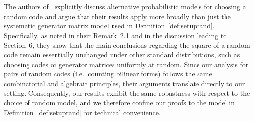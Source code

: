 \documentclass[a4paper,11pt,reqno]{article}
\theoremstyle{plain} \numberwithin{equation}{section}
\theoremstyle{definition}
\begin{document}
The authors of~\cite{cascudo2015squares} explicitly discuss alternative probabilistic models for choosing a random code and argue that their results apply more broadly than just the systematic generator matrix model used in Definition~\ref{def:setuprand}. Specifically, as noted in their Remark~2.1 and in the discussion leading to Section~6, they show that the main conclusions regarding the square of a random code remain essentially unchanged under other standard distributions, such as choosing codes or generator matrices uniformly at random. Since our analysis for pairs of random codes (i.e., counting bilinear forms) follows the same combinatorial and algebraic principles, their arguments translate directly to our setting. Consequently, our results exhibit the same robustness with respect to the choice of random model, and we therefore confine our proofs to the model in Definition~\ref{def:setuprand} for technical convenience. 
\end{document}
